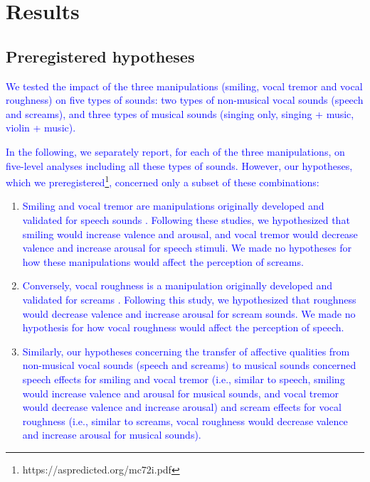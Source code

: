 \documentclass[openacc]{rsprocb_new}%
\begin{document}
\section*{Results}

\subsection{Preregistered hypotheses}

\textcolor{blue}{We tested the impact of the three manipulations (smiling, vocal tremor and vocal roughness) on five types of sounds: two types of non-musical vocal sounds (speech and screams), and three types of musical sounds (singing only, singing + music, violin + music). }

\textcolor{blue}{In the following, we separately report, for each of the three manipulations, on five-level analyses including all these types of sounds. However, our hypotheses, which we preregistered\footnote{https://aspredicted.org/mc72i.pdf}, concerned only a subset of these combinations: }
\begin{enumerate}
    \item \textcolor{blue}{Smiling and vocal tremor are manipulations originally developed and validated for speech sounds \cite{ARI18,RACH17}. Following these studies, we hypothesized that smiling would increase valence and arousal, and vocal tremor would decrease valence and increase arousal for speech stimuli. We made no hypotheses for how these manipulations would affect the perception of screams.} 
    \item \textcolor{blue}{Conversely, vocal roughness is a manipulation originally developed and validated for screams \cite{LIU20}. Following this study, we hypothesized that roughness would decrease valence and increase arousal for scream sounds. We made no hypothesis for how vocal roughness would affect the perception of speech. }
    \item \textcolor{blue}{Similarly, our hypotheses concerning the transfer of affective qualities from non-musical vocal sounds (speech and screams) to musical sounds concerned speech effects for smiling and vocal tremor (i.e., similar to speech, smiling would increase valence and arousal for musical sounds, and vocal tremor would decrease valence and increase arousal) and scream effects for vocal roughness (i.e., similar to screams, vocal roughness would decrease valence and increase arousal for musical sounds). }
\end{enumerate}
\end{document}
